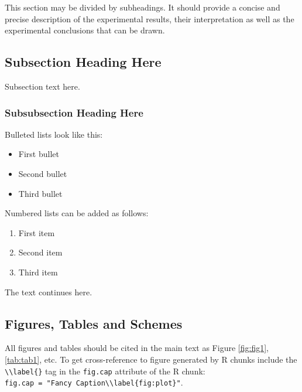 \documentclass[notspecified,article,submit,moreauthors,pdftex]{Definitions/mdpi}
\providecommand{\tightlist}{%
  \setlength{\itemsep}{0pt}\setlength{\parskip}{0pt}}
\begin{document}
This section may be divided by subheadings. It should provide a concise
and precise description of the experimental results, their
interpretation as well as the experimental conclusions that can be
drawn.

\subsection{Subsection Heading Here}\label{subsection-heading-here}

Subsection text here.

\subsubsection{Subsubsection Heading
Here}\label{subsubsection-heading-here}

Bulleted lists look like this:

\begin{itemize}
\tightlist
\item
  First bullet
\item
  Second bullet
\item
  Third bullet
\end{itemize}

Numbered lists can be added as follows:

\begin{enumerate}
\def\labelenumi{\arabic{enumi}.}
\tightlist
\item
  First item
\item
  Second item
\item
  Third item
\end{enumerate}

The text continues here.

\subsection{Figures, Tables and
Schemes}\label{figures-tables-and-schemes}

All figures and tables should be cited in the main text as Figure
\ref{fig:fig1}, \ref{tab:tab1}, etc. To get cross-reference to figure
generated by R chunks include the
\texttt{\textbackslash{}\textbackslash{}label\{\}} tag in the
\texttt{fig.cap} attribute of the R chunk:
\texttt{fig.cap\ =\ "Fancy\ Caption\textbackslash{}\textbackslash{}label\{fig:plot\}"}.
\end{document}
